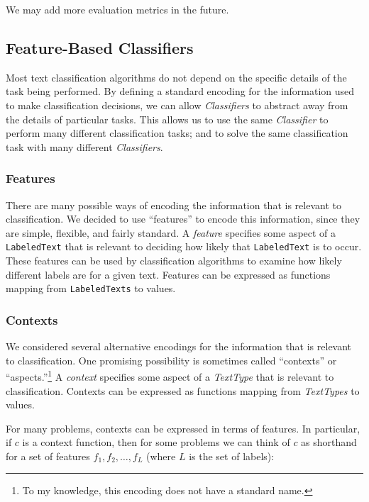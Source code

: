 \documentclass[12pt]{article}
\begin{document}
    We may add more evaluation metrics in the future.

  \subsection{Feature-Based Classifiers}

    Most text classification algorithms do not depend on the specific
    details of the task being performed. By defining a standard
    encoding for the information used to make classification
    decisions, we can allow \textit{Classifiers} to abstract away from
    the details of particular tasks.  This allows us to use the same
    \textit{Classifier} to perform many different classification
    tasks; and to solve the same classification task with many
    different \textit{Classifiers}.

    \subsubsection{Features}

      There are many possible ways of encoding the information that is
      relevant to classification.  We decided to use ``features'' to
      encode this information, since they are simple, flexible, and
      fairly standard.  A \emph{feature} specifies some aspect of a
      \texttt{LabeledText} that is relevant to deciding how likely
      that \texttt{LabeledText} is to occur.  These features can be
      used by classification algorithms to examine how likely
      different labels are for a given text.  Features can be
      expressed as functions mapping from \texttt{LabeledTexts} to
      values.

    \subsubsection{Contexts}

      We considered several alternative encodings for the information
      that is relevant to classification.  One promising possibility
      is sometimes called ``contexts'' or ``aspects.''\footnote{To my
      knowledge, this encoding does not have a standard name.}  A
      \emph{context} specifies some aspect of a \textit{TextType} that
      is relevant to classification.  Contexts can be expressed as
      functions mapping from \textit{TextTypes} to values.

      For many problems, contexts can be expressed in terms of
      features.  In particular, if $c$ is a context function, then for
      some problems we can think of $c$ as shorthand for a set of 
      features $f_1, f_2, \ldots, f_L$ (where $L$ is the set of labels):
\end{document}
